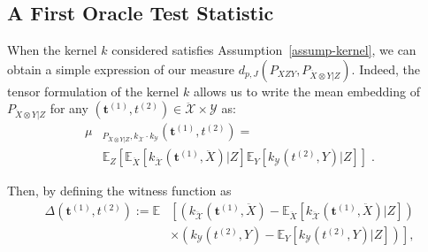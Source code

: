 \subsection{A First Oracle Test Statistic}
When the kernel $k$ considered satisfies Assumption~\ref{assump-kernel}, we can obtain a simple expression of our measure $d_{p,J}(P_{XZY},P_{\ddot{X}\otimes Y|Z})$. Indeed, the tensor formulation of the kernel $k$ allows us to write the mean embedding of $P_{\ddot{X}\otimes Y|Z}$ for any $(\mathbf{t}^{(1)},t^{(2)})\in\mathcal{\ddot{X}}\times\mathcal{Y}$ as:
\begin{equation}
\begin{aligned}
\label{eq-ME-tensor-cond}
    \mu&_{P_{\ddot{X}\otimes Y|Z},k_{\mathcal{\ddot{X}}}\cdot k_{\mathcal{Y}}}(\mathbf{t}^{(1)},t^{(2)})=\\
    &\mathbb{E}_{Z}\left[\mathbb{E}_{\ddot{X}}\left[k_{\mathcal{\ddot{X}}}(\mathbf{t}^{(1)},\ddot{X})|Z\right]
    \mathbb{E}_{Y}\left[k_{\mathcal{Y}}(t^{(2)},Y)|Z\right] \right]\; .
\end{aligned}
\end{equation}

Then, by defining the witness function as
\begin{align*}
    \Delta(\mathbf{t}^{(1)},t^{(2)}) :=\mathbb{E}&\left[\left(k_{\mathcal{\ddot{X}}}(\mathbf{t}^{(1)},\ddot{X})- \mathbb{E}_{\ddot{X}}\left[k_{\mathcal{\ddot{X}}}(\mathbf{t}^{(1)},\ddot{X})|Z\right]\right)\right. \\
    &\times\left.\left(k_{\mathcal{Y}}(t^{(2)},Y)- \mathbb{E}_{Y}\left[k_{\mathcal{Y}}(t^{(2)},Y)|Z\right]\right)\right],
\end{align*}

